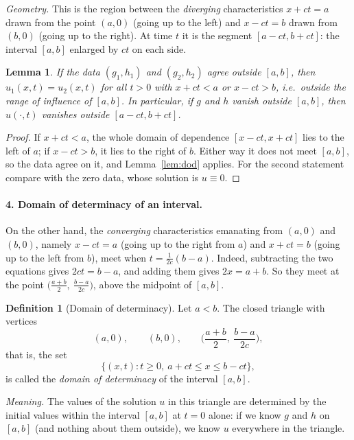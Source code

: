 \documentclass[11pt]{article}
\theoremstyle{plain}
\newtheorem{lemma}[theorem]{Lemma}
\theoremstyle{definition}
\newtheorem{definition}[theorem]{Definition}
\theoremstyle{remark}
\begin{document}
\emph{Geometry.} This is the region between the \emph{diverging} characteristics $x + ct = a$ drawn from the point $(a,0)$ (going up to the left) and $x - ct = b$ drawn from $(b,0)$ (going up to the right). At time $t$ it is the segment $[a - ct, b + ct]$: the interval $[a,b]$ enlarged by $ct$ on each side.

\begin{lemma}\label{lem:roiab}
If the data $(g_1,h_1)$ and $(g_2,h_2)$ agree outside $[a,b]$, then $u_1(x,t) = u_2(x,t)$ for all $t > 0$ with $x + ct < a$ or $x - ct > b$, i.e.\ outside the range of influence of $[a,b]$. In particular, if $g$ and $h$ vanish outside $[a,b]$, then $u(\cdot,t)$ vanishes outside $[a - ct, b + ct]$.
\end{lemma}
\begin{proof}
If $x + ct < a$, the whole domain of dependence $[x - ct, x + ct]$ lies to the left of $a$; if $x - ct > b$, it lies to the right of $b$. Either way it does not meet $[a,b]$, so the data agree on it, and Lemma~\ref{lem:dod} applies. For the second statement compare with the zero data, whose solution is $u \equiv 0$.
\end{proof}

\paragraph{4. Domain of determinacy of an interval.}

On the other hand, the \emph{converging} characteristics emanating from $(a,0)$ and $(b,0)$, namely $x - ct = a$ (going up to the right from $a$) and $x + ct = b$ (going up to the left from $b$), meet when $t = \frac{1}{2c}(b - a)$. Indeed, subtracting the two equations gives $2ct = b - a$, and adding them gives $2x = a + b$. So they meet at the point $\big(\frac{a+b}{2},\ \frac{b-a}{2c}\big)$, above the midpoint of $[a,b]$.

\begin{definition}[Domain of determinacy]\label{def:dodet}
Let $a < b$. The closed triangle with vertices
$$ (a,0), \qquad (b,0), \qquad \Big(\frac{a+b}{2},\ \frac{b-a}{2c}\Big), $$
that is, the set
$$ \big\{(x,t) : t \geq 0,\ a + ct \leq x \leq b - ct\big\}, $$
is called the \emph{domain of determinacy} of the interval $[a,b]$.
\end{definition}

\emph{Meaning.} The values of the solution $u$ in this triangle are determined by the initial values within the interval $[a,b]$ at $t = 0$ alone: if we know $g$ and $h$ on $[a,b]$ (and nothing about them outside), we know $u$ everywhere in the triangle.
\end{document}
